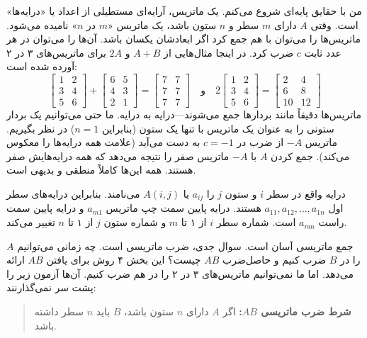\documentclass[12pt, a4paper]{book}
\begin{document}
	من با حقایق پایه‌ای شروع می‌کنم. یک ماتریس، آرایه‌ای مستطیلی از اعداد یا «درایه‌ها» است. وقتی $A$ دارای $m$ سطر و $n$ ستون باشد، یک ماتریس «$m$ در $n$» نامیده می‌شود. ماتریس‌ها را می‌توان با هم جمع کرد اگر ابعادشان یکسان باشد. آن‌ها را می‌توان در هر عدد ثابت $c$ ضرب کرد. در اینجا مثال‌هایی از $A+B$ و $2A$ برای ماتریس‌های ۳ در ۲ آورده شده است:
	\[
	\begin{bmatrix} 1 & 2 \\ 3 & 4 \\ 5 & 6 \end{bmatrix} +
	\begin{bmatrix} 6 & 5 \\ 4 & 3 \\ 2 & 1 \end{bmatrix} =
	\begin{bmatrix} 7 & 7 \\ 7 & 7 \\ 7 & 7 \end{bmatrix}
	\quad \text{و} \quad
	2 \begin{bmatrix} 1 & 2 \\ 3 & 4 \\ 5 & 6 \end{bmatrix} =
	\begin{bmatrix} 2 & 4 \\ 6 & 8 \\ 10 & 12 \end{bmatrix}
	\]
	ماتریس‌ها دقیقاً مانند بردارها جمع می‌شوند—درایه به درایه. ما حتی می‌توانیم یک بردار ستونی را به عنوان یک ماتریس با تنها یک ستون (بنابراین $n=1$) در نظر بگیریم. ماتریس $-A$ از ضرب در $c=-1$ به دست می‌آید (علامت همه درایه‌ها را معکوس می‌کند). جمع کردن $A$ با $-A$ ماتریس صفر را نتیجه می‌دهد که همه درایه‌هایش صفر هستند. همه این‌ها کاملاً منطقی و بدیهی است.
	
	درایه واقع در سطر $i$ و ستون $j$ را $a_{ij}$ یا $A(i,j)$ می‌نامند. بنابراین درایه‌های سطر اول $a_{11}, a_{12}, \dots, a_{1n}$ هستند. درایه پایین سمت چپ ماتریس $a_{m1}$ و درایه پایین سمت راست $a_{mn}$ است. شماره سطر $i$ از ۱ تا $m$ و شماره ستون $j$ از ۱ تا $n$ تغییر می‌کند.
	
	جمع ماتریسی آسان است. سوال جدی، ضرب ماتریسی است. چه زمانی می‌توانیم $A$ را در $B$ ضرب کنیم و حاصل‌ضرب $AB$ چیست؟ این بخش ۴ روش برای یافتن $AB$ ارائه می‌دهد. اما ما نمی‌توانیم ماتریس‌های ۳ در ۲ را در هم ضرب کنیم. آن‌ها آزمون زیر را پشت سر نمی‌گذارنند:
	
	\begin{quote}
		\textbf{شرط ضرب ماتریسی $AB$:} اگر $A$ دارای $n$ ستون باشد، $B$ باید $n$ سطر داشته باشد.
	\end{quote}
	
\end{document}
